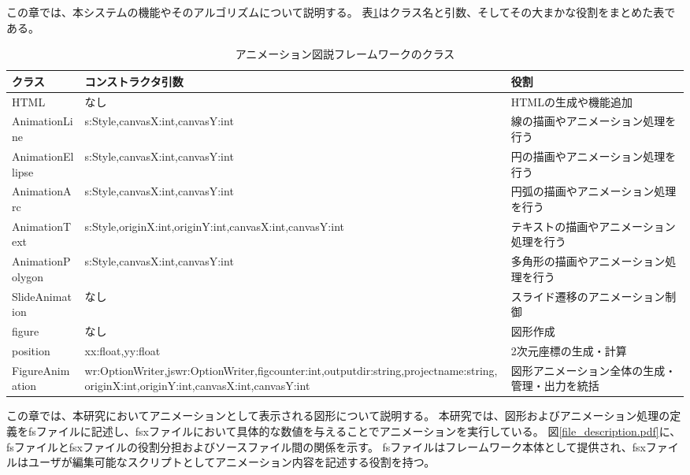  この章では、本システムの機能やそのアルゴリズムについて説明する。
表\ref{table:class}はクラス名と引数、そしてその大まかな役割をまとめた表である。
\begin{table}[htbp]
    \caption{アニメーション図説フレームワークのクラス}
    \label{table:class}
    \centering
     \begin{tabular}{|l|p{6.3cm}|p{6.3cm}|} %
      \hline
      クラス & コンストラクタ引数 & 役割 \\
      \hline
      HTML & なし & HTMLの生成や機能追加 \\
      AnimationLine & s:Style,canvasX:int,canvasY:int & 線の描画やアニメーション処理を行う \\
      AnimationEllipse & s:Style,canvasX:int,canvasY:int & 円の描画やアニメーション処理を行う \\
      AnimationArc & s:Style,canvasX:int,canvasY:int & 円弧の描画やアニメーション処理を行う \\
      AnimationText & s:Style,originX:int,originY:int,canvasX:int,canvasY:int & テキストの描画やアニメーション処理を行う \\
      AnimationPolygon & s:Style,canvasX:int,canvasY:int & 多角形の描画やアニメーション処理を行う \\
      SlideAnimation & なし & スライド遷移のアニメーション制御 \\
      figure & なし & 図形作成 \\
      position & xx:float,yy:float & 2次元座標の生成・計算 \\
      FigureAnimation & wr:OptionWriter,jswr:OptionWriter,figcounter:int,outputdir:string,projectname:string,originX:int,originY:int,canvasX:int,canvasY:int & 図形アニメーション全体の生成・管理・出力を統括 \\
      \hline
     \end{tabular}
\end{table}
\par
この章では、本研究においてアニメーションとして表示される図形について説明する。
本研究では、図形およびアニメーション処理の定義をfsファイルに記述し、fsxファイルにおいて具体的な数値を与えることでアニメーションを実行している。
図\ref{file_description.pdf}に、fsファイルとfsxファイルの役割分担およびソースファイル間の関係を示す。
fsファイルはフレームワーク本体として提供され、fsxファイルはユーザが編集可能なスクリプトとしてアニメーション内容を記述する役割を持つ。

